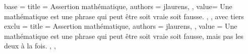 {
  base = {
    title = Assertion mathématique,
    authors = {
      jlaurens,
    },
    value={
       Une  mathématique est une phrase qui peut être soit vraie soit fausse.
    },
  },
  avec tiers exclu = {
    title = Assertion mathématique,
    authors = {
      jlaurens,
    },
    value = {
       Une  mathématique est une phrase qui peut être soit vraie soit fausse, mais pas les deux à la fois.
    },
  },
}
